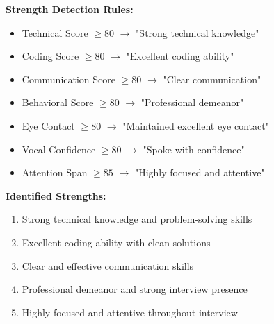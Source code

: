 \documentclass[12pt,a4paper]{article}
\begin{document}
\begin{tcolorbox}[colback=successgreen!5,colframe=successgreen,title=\textbf{STEP 7: Identify Strengths}]
\textbf{Strength Detection Rules:}

\begin{itemize}
    \item Technical Score $\geq 80$ $\rightarrow$ "Strong technical knowledge"
    \item Coding Score $\geq 80$ $\rightarrow$ "Excellent coding ability"
    \item Communication Score $\geq 80$ $\rightarrow$ "Clear communication"
    \item Behavioral Score $\geq 80$ $\rightarrow$ "Professional demeanor"
    \item Eye Contact $\geq 80$ $\rightarrow$ "Maintained excellent eye contact"
    \item Vocal Confidence $\geq 80$ $\rightarrow$ "Spoke with confidence"
    \item Attention Span $\geq 85$ $\rightarrow$ "Highly focused and attentive"
\end{itemize}

\textbf{Identified Strengths:}
\begin{enumerate}
    \item Strong technical knowledge and problem-solving skills
    \item Excellent coding ability with clean solutions
    \item Clear and effective communication skills
    \item Professional demeanor and strong interview presence
    \item Highly focused and attentive throughout interview
\end{enumerate}
\end{tcolorbox}

\vspace{0.5cm}
\end{document}
